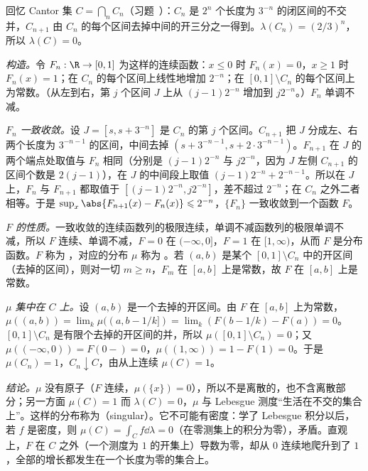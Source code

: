 \begin{example}[Cantor 分布]\label{ex:distributions:cantor}
回忆 Cantor 集 $C=\bigcap_nC_n$（习题~）：$C_n$ 是 $2^n$ 个长度为 $3^{-n}$ 的闭区间的不交并，$C_{n+1}$ 由 $C_n$ 的每个区间去掉中间的开三分之一得到。$\lambda(C_n)=(2/3)^n$，所以 $\lambda(C)=0$。

\emph{构造。}令 $F_n:\R\to[0,1]$ 为这样的连续函数：$x\leqslant0$ 时 $F_n(x)=0$，$x\geqslant1$ 时 $F_n(x)=1$；在 $C_n$ 的每个区间上线性地增加 $2^{-n}$；在 $[0,1]\setminus C_n$ 的每个区间上为常数。（从左到右，第 $j$ 个区间 $J$ 上从 $(j-1)2^{-n}$ 增加到 $j2^{-n}$。）$F_n$ 单调不减。

\emph{$F_n$ 一致收敛。}设 $J=[s,s+3^{-n}]$ 是 $C_n$ 的第 $j$ 个区间。$C_{n+1}$ 把 $J$ 分成左、右两个长度为 $3^{-n-1}$ 的区间，中间去掉 $(s+3^{-n-1},s+2\cdot3^{-n-1})$。$F_{n+1}$ 在 $J$ 的两个端点处取值与 $F_n$ 相同（分别是 $(j-1)2^{-n}$ 与 $j2^{-n}$，因为 $J$ 左侧 $C_{n+1}$ 的区间个数是 $2(j-1)$），在 $J$ 的中间段上取值 $(j-1)2^{-n}+2^{-n-1}$。所以在 $J$ 上，$F_n$ 与 $F_{n+1}$ 都取值于 $[(j-1)2^{-n},j2^{-n}]$，差不超过 $2^{-n}$；在 $C_n$ 之外二者相等。于是 $\sup_x\abs{F_{n+1}(x)-F_n(x)}\leqslant2^{-n}$，$\{F_n\}$ 一致收敛到一个函数 $F$。

\emph{$F$ 的性质。}一致收敛的连续函数列的极限连续，单调不减函数列的极限单调不减，所以 $F$ 连续、单调不减，$F=0$ 在 $(-\infty,0]$，$F=1$ 在 $[1,\infty)$，从而 $F$ 是分布函数。$F$ 称为 ，对应的分布 $\mu$ 称为 。若 $(a,b)$ 是某个 $[0,1]\setminus C_n$ 中的开区间（去掉的区间），则对一切 $m\geqslant n$，$F_m$ 在 $[a,b]$ 上是常数，故 $F$ 在 $[a,b]$ 上是常数。

\emph{$\mu$ 集中在 $C$ 上。}设 $(a,b)$ 是一个去掉的开区间。由 $F$ 在 $[a,b]$ 上为常数，$\mu((a,b))=\lim_k\mu((a,b-1/k])=\lim_k(F(b-1/k)-F(a))=0$。$[0,1]\setminus C_n$ 是有限个去掉的开区间的并，所以 $\mu([0,1]\setminus C_n)=0$；又 $\mu((-\infty,0))=F(0-)=0$，$\mu((1,\infty))=1-F(1)=0$。于是 $\mu(C_n)=1$，$C_n\downarrow C$，由从上连续 $\mu(C)=1$。

\emph{结论。}$\mu$ 没有原子（$F$ 连续，$\mu(\{x\})=0$），所以不是离散的，也不含离散部分；另一方面 $\mu(C)=1$ 而 $\lambda(C)=0$，$\mu$ 与 Lebesgue 测度“生活在不交的集合上”。这样的分布称为（singular）。它不可能有密度：学了 Lebesgue 积分以后，若 $f$ 是密度，则 $\mu(C)=\int_Cf\dd\lambda=0$（在零测集上的积分为零），矛盾。直观上，$F$ 在 $C$ 之外（一个测度为 $1$ 的开集上）导数为零，却从 $0$ 连续地爬升到了 $1$，全部的增长都发生在一个长度为零的集合上。
\end{example}

